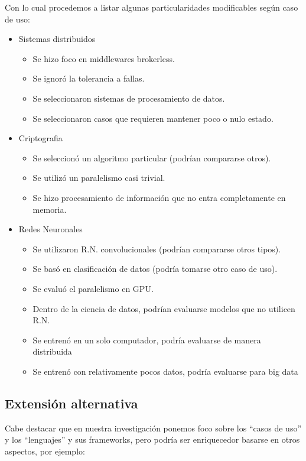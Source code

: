 \documentclass[11pt]{article}
\let\Oldsubsection\subsection
\renewcommand{\subsection}{\FloatBarrier\Oldsubsection}
\begin{document}
Con lo cual procedemos a listar algunas particularidades modificables según caso de uso:
\begin{itemize}
    \item Sistemas distribuidos
    \begin{itemize}
        \item Se hizo foco en middlewares brokerless.
        \item Se ignoró la tolerancia a fallas.
        \item Se seleccionaron sistemas de procesamiento de datos.
        \item Se seleccionaron casos que requieren mantener poco o nulo estado.
    \end{itemize}
    \item Criptografia
    \begin{itemize}
        \item Se seleccionó un algoritmo particular (podrían compararse otros).
        \item Se utilizó un paralelismo casi trivial.
        \item Se hizo procesamiento de información que no entra completamente en memoria.
    \end{itemize}
    \item Redes Neuronales
    \begin{itemize}
        \item Se utilizaron R.N. convolucionales (podrían compararse otros tipos).
        \item Se basó en clasificación de datos (podría tomarse otro caso de uso).
        \item Se evaluó el paralelismo en GPU.
        \item Dentro de la ciencia de datos, podrían evaluarse modelos que no utilicen R.N.
        \item Se entrenó en un solo computador, podría evaluarse de manera distribuida
        \item Se entrenó con relativamente pocos datos, podría evaluarse para big data
    \end{itemize}
\end{itemize}

\subsection{Extensión alternativa}

Cabe destacar que en nuestra investigación ponemos foco sobre los “casos de uso” y los “lenguajes” y sus frameworks, pero podría ser enriquecedor basarse en otros aspectos, por ejemplo:
\end{document}
